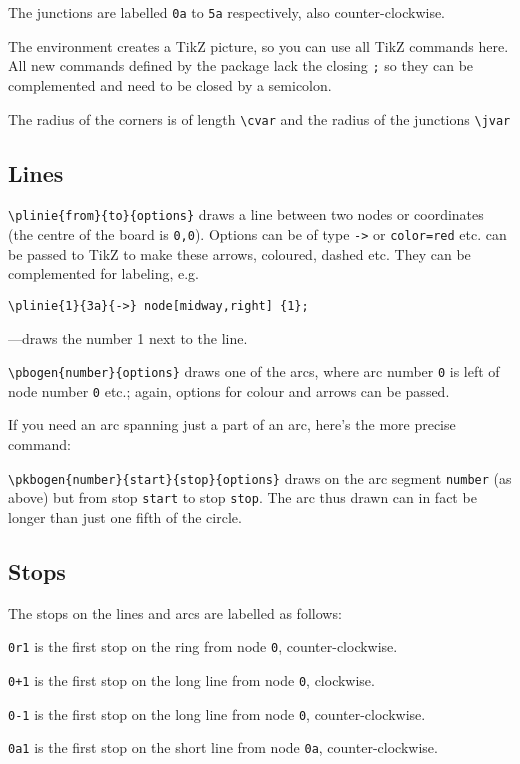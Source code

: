 \documentclass[a5paper]{scrartcl}
\begin{document}
The junctions are labelled \verb|0a| to \verb|5a| respectively, also counter-clockwise.

The environment creates a TikZ picture, so you can use all TikZ commands here. All new commands defined by the package lack the closing \verb|;| so they can be complemented and need to be closed by a semicolon. 

The radius of the corners is of length \verb|\cvar| and the radius of the junctions \verb|\jvar|

\subsection*{Lines}

\verb|\plinie{from}{to}{options}| draws a line between two nodes or coordinates (the centre of the board is \verb|0,0|). Options can be of type \verb|->| or \verb|color=red| etc. can be passed to TikZ to make these arrows, coloured, dashed etc. They can be complemented for labeling, e.g.

\verb|\plinie{1}{3a}{->} node[midway,right] {1};|

---draws the number 1 next to the line.

\verb|\pbogen{number}{options}| draws one of the arcs, where arc number \verb|0| is left of node number \verb|0| etc.; again, options for colour and arrows can be passed. 

If you need an arc spanning just a part of an arc, here's the more precise command:

\verb|\pkbogen{number}{start}{stop}{options}| draws on the arc segment \verb|number| (as above) but from stop \verb|start| to stop  \verb|stop|. The arc thus drawn can in fact be longer than just one fifth of the circle. 

\subsection*{Stops}

The stops on the lines and arcs are labelled as follows:

\verb|0r1| is the first stop on the ring from node \verb|0|, counter-clockwise.
    
\verb|0+1| is the first stop on the long line from node \verb|0|, clockwise.
    
\verb|0-1| is the first stop on the long line from node \verb|0|, counter-clockwise.
    
\verb|0a1| is the first stop on the short line from node \verb|0a|, counter-clockwise.
\end{document}
